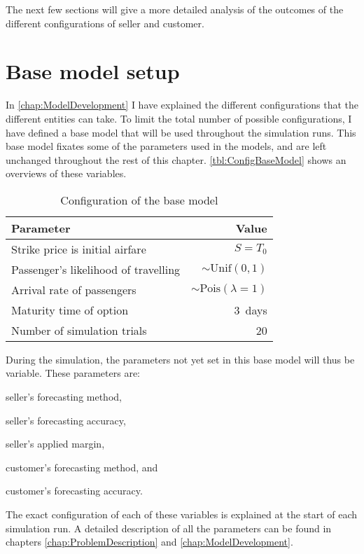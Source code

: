 The next few sections will give a more detailed analysis of the outcomes of the different configurations of seller and customer.



\section{Base model setup}
In \autoref{chap:ModelDevelopment} I have explained the different configurations that the different entities can take. To limit the total number of possible configurations, I have defined a base model that will be used throughout the simulation runs. This base model fixates some of the parameters used in the models, and are left unchanged throughout the rest of this chapter. \autoref{tbl:ConfigBaseModel} shows an overviews of these variables.
 \begin{table} \centering
    \begin{tabular}{l  r}
    \toprule
    Parameter      &  Value \\
    \midrule
    Strike price is initial airfare  &  $S = T_0$ \\
    Passenger's likelihood of travelling  &  $\sim \mbox{Unif}(0, 1)$  \\
    Arrival rate of passengers   &  $\sim \mbox{Pois}(\lambda=1)$ \\
    Maturity time of option      &  3~days \\
    Number of simulation trials  &  20 \\
    \bottomrule
    \end{tabular}
    \caption{Configuration of the base model}
    \label{tbl:ConfigBaseModel}
\end{table}
During the simulation, the parameters not yet set in this base model will thus be variable. These parameters are:


\begin{compactitem}
    \item seller's forecasting method,
    \item seller's forecasting accuracy,
    \item seller's applied margin,
    \item customer's forecasting method, and
    \item customer's forecasting accuracy.
\end{compactitem}

The exact configuration of each of these variables is explained at the start of each simulation run. A detailed description of all the parameters can be found in chapters \ref{chap:ProblemDescription} and \ref{chap:ModelDevelopment}.



